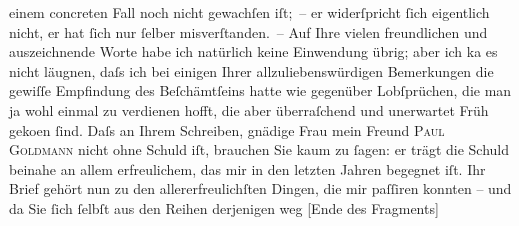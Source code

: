 \begin{ledgroupsized}[t]{13cm}
               einem concreten Fall noch nicht gewachſen iſt; – er widerſpricht ſich eigentlich
               nicht, er hat ſich nur ſelber misverſtanden. – Auf Ihre vielen freundlichen und
                  auszeich{\pb}nende Worte habe ich natürlich keine Einwendung übrig; aber
               ich ka{\geminationn} es nicht läugnen, daſs ich bei einigen Ihrer
               allzuliebenswürdigen Bemerkungen die gewiſſe Empfindung des Beſchämtſeins hatte wie
               gegenüber Lobſprüchen, die man ja wohl einmal zu verdienen hofft, die aber
               überraſchend und unerwartet Früh geko{\geminationm}en ſind.\pend
           \pstart
           {\pb}Daſs an Ihrem Schreiben, gnädige Frau mein Freund \textsc{Paul Goldmann} nicht ohne Schuld iſt, brauchen Sie kaum zu ſagen: er trägt die Schuld beinahe
               an allem erfreulichem, das mir in den letzten Jahren begegnet iſt. Ihr Brief gehört
               nun zu den allererfreulichſten Dingen, die mir paſſiren konnten – und da Sie ſich
               ſelbſt aus den Reihen derjenigen weg {[}Ende des Fragments{]}\pend
           
         
         \endnumbering{}\end{ledgroupsized}  \newcommand{\dateiname}{L00337}\newcommand{\titel}{Arthur Schnitzler an Lou Andreas-Salomé, 13. 6. 1894}\newcommand{\editorInnen}{Martin Anton Müller und Gerd-Hermann Susen}
      